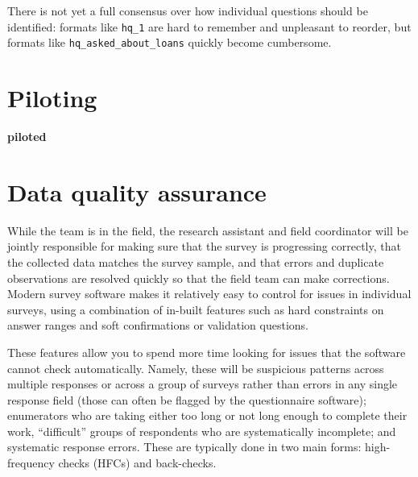 There is not yet a full consensus over how individual questions should be identified:
formats like \texttt{hq\_1} are hard to remember and unpleasant to reorder,
but formats like \texttt{hq\_asked\_about\_loans} quickly become cumbersome.

\section{Piloting}
\textbf{piloted}

\section{Data quality assurance}

While the team is in the field, the research assistant
and field coordinator will be jointly responsible
for making sure that the survey is progressing correctly,
that the collected data matches the survey sample,
and that errors and duplicate observations are resolved
quickly so that the field team can make corrections.
Modern survey software makes it relatively easy
to control for issues in individual surveys,
using a combination of in-built features
such as hard constraints on answer ranges
and soft confirmations or validation questions.

These features allow you to spend more time
looking for issues that the software cannot check automatically.
Namely, these will be suspicious patterns across multiple responses
or across a group of surveys rather than errors in any single response field
(those can often be flagged by the questionnaire software);
enumerators who are taking either too long or not long enough to complete their work,
``difficult'' groups of respondents who are systematically incomplete; and
systematic response errors.
These are typically done in two main forms:
high-frequency checks (HFCs) and back-checks.

